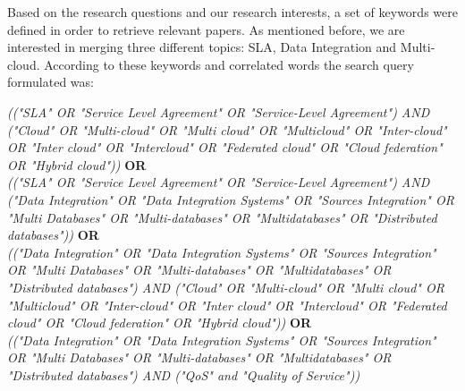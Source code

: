 Based on the research questions and our research interests, a set of keywords were defined in order to 
retrieve relevant papers.
As mentioned before, we are interested in merging three different topics: SLA, Data Integration and Multi-cloud.
According to these keywords and correlated words the search query formulated was:
\medskip  \\
\begin{small}
\textit{(("SLA" OR "Service Level Agreement" OR "Service-Level Agreement") AND 
   ("Cloud" OR "Multi-cloud" OR "Multi cloud" OR "Multicloud" OR "Inter-cloud" OR 
      "Inter cloud" OR "Intercloud" OR "Federated cloud" OR "Cloud federation" OR 
\medskip        "Hybrid cloud"))} \textbf{OR} \\ 
\textit{(("SLA" OR "Service Level Agreement" OR "Service-Level Agreement") AND 
   ("Data Integration" OR "Data Integration Systems" OR "Sources Integration" OR 
      "Multi Databases" OR "Multi-databases" OR "Multidatabases" OR }
\medskip        \textit{ "Distributed databases"))} \textbf{OR} \\
\textit{(("Data Integration" OR "Data Integration Systems" OR "Sources Integration" OR 
   "Multi Databases" OR "Multi-databases" OR "Multidatabases" OR 
      "Distributed databases") AND 
   ("Cloud" OR "Multi-cloud" OR "Multi cloud" OR "Multicloud" OR "Inter-cloud" OR 
      "Inter cloud" OR "Intercloud" OR "Federated cloud" OR "Cloud federation" OR }
\medskip       \textit{ "Hybrid cloud"))} \textbf{OR} \\
\textit{(("Data Integration" OR "Data Integration Systems" OR "Sources Integration" OR 
   "Multi Databases" OR "Multi-databases" OR "Multidatabases" OR 
      "Distributed databases") AND 
   ("QoS" and "Quality of Service"))}
\end{small}
\medskip

